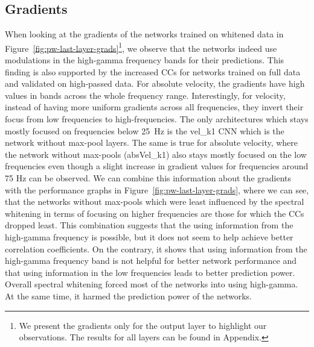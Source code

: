 \subsection{Gradients}\label{subsec:pw-gradients2}
When looking at the gradients of the networks trained on whitened data in Figure~\ref{fig:pw-last-layer-grads}\footnote{We present the gradients only for the output layer to highlight our observations. 
The results for all layers can be found in Appendix.}, we observe that the networks indeed use modulations in the high-gamma frequency bands for their predictions. 
This finding is also supported by the increased CCs for networks trained on full data and validated on high-passed data.
For absolute velocity, the gradients have high values in bands across the whole frequency range. Interestingly, for velocity, instead of having more uniform gradients across all frequencies, they invert their focus from low frequencies to high-frequencies.
The only architectures which stays mostly focused on frequencies below 25~Hz is the vel\_k1 CNN which is the network without max-pool layers.
The same is true for absolute velocity, where the network without max-pools (absVel\_k1) also stays mostly focused on the low frequencies even though a slight increase in gradient values for frequencies around 75 Hz can be observed. 
We can combine this information about the gradients with the performance graphs in Figure~\ref{fig:pw-last-layer-grads}, where we can see, that the networks without max-pools which were least influenced by the spectral whitening in terms of focusing on higher frequencies are those for which the CCs dropped least.
This combination suggests that the using information from the high-gamma frequency is possible, but it does not seem to help achieve better correlation coefficients. 
On the contrary, it shows that using information from the high-gamma frequency band is not helpful for better network performance and that using information in the low frequencies leads to better prediction power.\\

Overall spectral whitening forced most of the networks into using high-gamma. 
At the same time, it harmed the prediction power of the networks. 

